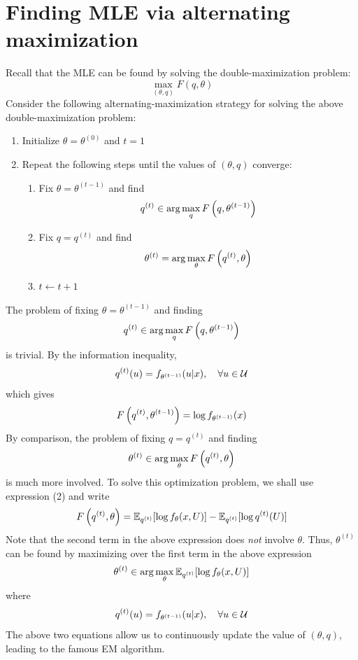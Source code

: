 \documentclass[11pt]{book}
\begin{document}
\section{Finding MLE via alternating maximization}
Recall that the MLE can be found by solving the double-maximization problem: 
\[
  \max_{(\theta, q)} F(q, \theta) 
\]
Consider the following alternating-maximization strategy for solving the above double-maximization problem: 
\begin{enumerate}
  \item Initialize $\theta = \theta^{(0)}$ and $t=1$
  \item Repeat the following steps until the values of $(\theta, q)$ converge:
    \begin{enumerate}
      \item Fix $\theta = \theta^{(t-1)}$ and find 
        \[
          q^{(t)} \in \arg\max_{q}F\left( q,\theta^{(t-1)} \right)
        \] 
      \item Fix $q = q^{(t)}$ and find
        \[
          \theta^{(t)} = \arg\max_{\theta}F\left( q^{(t)}, \theta \right)
        \]
      \item $t \leftarrow t + 1$
    \end{enumerate}
\end{enumerate}
The problem of fixing $\theta = \theta^{(t-1)}$ and finding 
\[
  q^{(t)} \in \arg\max_{q}F\left( q,\theta^{(t-1)} \right)
\] 
is trivial. By the information inequality, 
\[
  q^{(t)}(u) = f_{\theta^{(t-1)}} (u|x),\quad\forall u\in\mathcal{U} 
\] 
which gives 
\[
  F\left( q^{(t)}, \theta^{(t-1)} \right) = \log f_{\theta^{(t-1)}}(x)
\]
By comparison, the problem of fixing $q=q^{(t)}$ and finding 
\[
  \theta^{(t)} \in \arg\max_{\theta}F\left( q^{(t)},\theta \right) 
\]  
is much more involved. To solve this optimization problem, we shall use expression (2) and write %
\[
  F\left( q^{(t)}, \theta \right) = \mathbb{E}_{q^{(t)}} [ \log f_\theta(x, U)] - \mathbb{E}_{q^{(t)}} [\log q^{(t)}(U)]
\]
Note that the second term in the above expression does \textit{not} involve $\theta$. Thus, $\theta^{(t)}$ can be found by maximizing
over the first term in the above expression 
\[
  \theta^{(t)} \in \arg\max_{\theta} \mathbb{E}_{q^{(t)}} [\log f_\theta(x, U)] 
\] 
where 
\[
  q^{(t)} (u) = f_{\theta^{(t-1)}} (u | x), \quad\forall u\in\mathcal{U} 
\]
The above two equations allow us to continuously update the value of $(\theta, q)$, leading to the famous EM algorithm.
\end{document}
